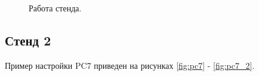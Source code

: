 \documentclass[a4paper,14pt]{article}
\begin{document}
\begin{figure}[!h]
    \caption{Работа стенда.}
    \label{fig:ping2}
\end{figure}

\newpage
\subsection*{Стенд 2}

Пример настройки PC7 приведен на рисунках \ref{fig:pc7} - \ref{fig:pc7_2}.
\end{document}
